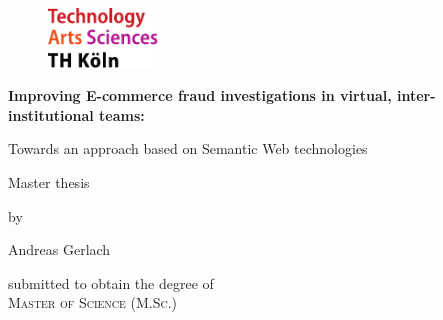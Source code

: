 
\begin{titlepage}

\begin{center}

\begin{figure}[!ht]
		\includegraphics[width=0.26\textwidth]{images/THlogoheader.pdf}
\end{figure}

\vspace{0.8cm}

\begin{rmfamily}
\begin{huge}
\textbf{Improving E-commerce fraud investigations in virtual, inter-institutional teams:}\\
\end{huge}
\vspace{0.5cm}
\begin{LARGE}
Towards an approach based on Semantic Web technologies
\end{LARGE}
\end{rmfamily}

\vspace{1cm}


\begin{LARGE}
\begin{scshape}
Master thesis\\[0.8em]
\end{scshape}
\end{LARGE}

\begin{large}
by\\
\vspace{0.2cm}
\begin{LARGE}
Andreas Gerlach\\
\end{LARGE}
\end{large}

\vspace{1.0cm}

\begin{large}
submitted to obtain the degree of\\
\vspace{0.4cm}
\textsc{Master of Science (M.Sc.)}\\
\end{large}


\end{center}
\end{titlepage}
